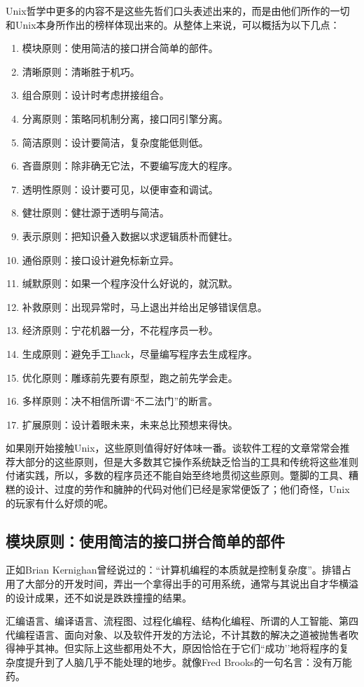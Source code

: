 \documentclass[12pt,oneside]{book}
\begin{document}
\begin{common-format}
Unix哲学中更多的内容不是这些先哲们口头表述出来的，而是由他们所作的一切和Unix本身所作出的榜样体现出来的。从整体上来说，可以概括为以下几点：
\begin{enumerate}
\item 模块原则：使用简洁的接口拼合简单的部件。
\item 清晰原则：清晰胜于机巧。
\item 组合原则：设计时考虑拼接组合。
\item 分离原则：策略同机制分离，接口同引擎分离。
\item 简洁原则：设计要简洁，复杂度能低则低。
\item 吝啬原则：除非确无它法，不要编写庞大的程序。
\item 透明性原则：设计要可见，以便审查和调试。
\item 健壮原则：健壮源于透明与简洁。
\item 表示原则：把知识叠入数据以求逻辑质朴而健壮。
\item 通俗原则：接口设计避免标新立异。
\item 缄默原则：如果一个程序没什么好说的，就沉默。
\item 补救原则：出现异常时，马上退出并给出足够错误信息。
\item 经济原则：宁花机器一分，不花程序员一秒。
\item 生成原则：避免手工hack，尽量编写程序去生成程序。
\item 优化原则：雕琢前先要有原型，跑之前先学会走。
\item 多样原则：决不相信所谓“不二法门”的断言。
\item 扩展原则：设计着眼未来，未来总比预想来得快。
\end{enumerate}

如果刚开始接触Unix，这些原则值得好好体味一番。谈软件工程的文章常常会推荐大部分的这些原则，但是大多数其它操作系统缺乏恰当的工具和传统将这些准则付诸实践，所以，多数的程序员还不能自始至终地贯彻这些原则。蹩脚的工具、糟糕的设计、过度的劳作和臃肿的代码对他们已经是家常便饭了；他们奇怪，Unix的玩家有什么好烦的呢。


\subsection{模块原则：使用简洁的接口拼合简单的部件}
正如Brian Kernighan曾经说过的：“计算机编程的本质就是控制复杂度”\cite{Kernighan-Plauger}。排错占用了大部分的开发时间，弄出一个拿得出手的可用系统，通常与其说出自才华横溢的设计成果，还不如说是跌跌撞撞的结果。

汇编语言、编译语言、流程图、过程化编程、结构化编程、所谓的人工智能、第四代编程语言、面向对象、以及软件开发的方法论，不计其数的解决之道被抛售者吹得神乎其神。但实际上这些都用处不大，原因恰恰在于它们“成功’’地将程序的复杂度提升到了人脑几乎不能处理的地步。就像Fred Brooks的一句名言\cite{Brooks}：没有万能药。


\end{common-format}
\end{document}
